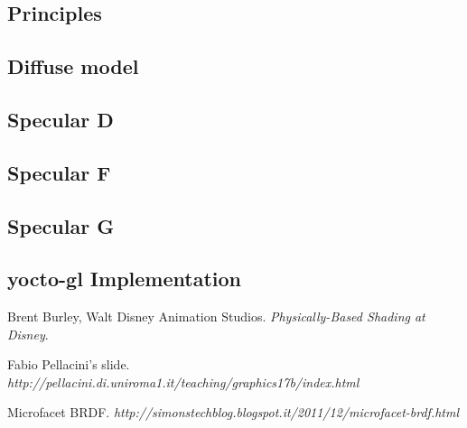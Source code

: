 \documentclass[11pt]{article}
\begin{document}
\subsection{Principles}
\subsection{Diffuse model}
\subsection{Specular D}
\subsection{Specular F}
\subsection{Specular G}
\subsection{yocto-gl Implementation}


\begin{thebibliography}{9}
	Brent Burley, Walt Disney Animation Studios. 
	\textit{Physically-Based Shading at Disney}.
	
	Fabio Pellacini's slide. 
	\textit{http://pellacini.di.uniroma1.it/teaching/graphics17b/index.html}

	Microfacet BRDF. 
	\textit{http://simonstechblog.blogspot.it/2011/12/microfacet-brdf.html}
	
	
	
\end{thebibliography}
\end{document}
